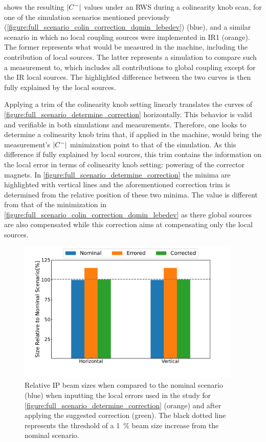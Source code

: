  shows the resulting \(\left\lvert C^{-} \right\rvert\) values under an RWS during a colinearity knob scan, for one of the simulation scenarios mentioned previously (\cref{figure:full_scenario_colin_correction_dqmin_lebedev}) (\textcolor{mplblue}{blue}), and a similar scenario in which no local coupling sources were implemented in IR\num{1} (\textcolor{mplorange}{orange}).
The former represents what would be measured in the machine, including the contribution of local sources.
The latter represents a simulation to compare such a measurement to, which includes all contributions to global coupling except for the IR local sources.
The highlighted difference between the two curves is then fully explained by the local sources.

Applying a trim of the colinearity knob setting linearly translates the curves of \cref{figure:full_scenario_determine_correction} horizontally.
This behavior is valid and verifiable in both simulations and measurements.
Therefore, one looks to determine a colinearity knob trim that, if applied in the machine, would bring the measurement's \(\left\lvert C^{-} \right\rvert\) minimization point to that of the simulation.
As this difference if fully explained by local sources, this trim contains the information on the local error in terms of colinearity knob setting: powering of the corrector magnets.
In \cref{figure:full_scenario_determine_correction} the minima are highlighted with vertical lines and the aforementioned correction trim is determined from the relative position of these two minima.
The value is different from that of the minimization in \cref{figure:full_scenario_colin_correction_dqmin_lebedev} as there global sources are also compensated while this correction aims at compensating only the local sources.

\begin{figure}[!htb]
    \centering
    \includegraphics*[width=0.95\textwidth]{Figures/IR_Coupling_Correction/full_scenario_correction_efficiency.pdf}
    \caption{Relative IP beam sizes when compared to the nominal scenario (\textcolor{mplblue}{blue}) when inputting the local errors used in the study for \cref{figure:full_scenario_determine_correction} (\textcolor{mplorange}{orange}) and after applying the suggested correction (\textcolor{mplgreen}{green}). The black dotted line represents the threshold of a \qty{1}{\percent} beam size increase from the nominal scenario.}
    \label{figure:full_scenario_correction_efficiency}
\end{figure}

